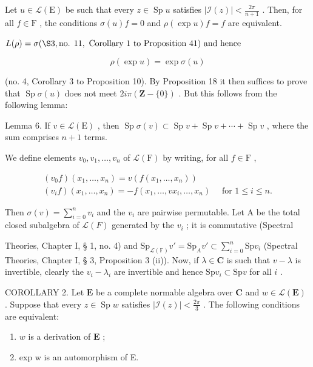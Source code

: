 Let \(u \in \mathcal{L}(\mathrm{E})\) be such that every \(z \in \operatorname{Sp} u\) satisfies \(|\mathcal{I}(z)| < \frac{2\pi}{n + 1}\) . Then, for all \(f \in \mathrm{F}\) , the conditions \(\sigma(u)f = 0\) and \(\rho(\exp u)f = f\) are equivalent.

\(L(\rho) = \sigma (\S 3, \text{no. } 11, \text{ Corollary 1 to Proposition 41}) \text{ and hence}\)

\[
\rho (\exp u) = \exp \sigma (u)
\]

(no. 4, Corollary 3 to Proposition 10). By Proposition 18 it then suffices to prove that \(\operatorname{Sp} \sigma(u)\) does not meet \(2i\pi(\mathbf{Z} - \{0\})\) . But this follows from the following lemma:

Lemma 6. If \(v \in \mathcal{L}(\mathrm{E})\) , then \(\operatorname{Sp} \sigma(v) \subset \operatorname{Sp} v + \operatorname{Sp} v + \cdots + \operatorname{Sp} v\) , where the sum comprises \(n + 1\) terms.

We define elements \(v_{0}, v_{1}, \ldots, v_{n}\) of \(\mathcal{L}(\mathrm{F})\) by writing, for all \(f \in \mathrm{F}\) ,

\[
\begin{array}{l} (v _ {0} f) (x _ {1}, \dots , x _ {n}) = v (f (x _ {1}, \dots , x _ {n})) \\ (v _ {i} f) (x _ {1}, \dots , x _ {n}) = - f (x _ {1}, \dots , v x _ {i}, \dots , x _ {n}) \quad \text { for } 1 \leqslant i \leqslant n. \end{array}
\]

Then \(\sigma(v) = \sum_{i=0}^{n} v_i\) and the \(v_i\) are pairwise permutable. Let A be the total closed subalgebra of \(\mathcal{L}(F)\) generated by the \(v_i\) ; it is commutative (Spectral

Theories, Chapter I, § 1, no. 4) and \(\mathrm{Sp}_{\mathcal{L}(\mathbb{F})}v' = \mathrm{Sp}_A v' \subset \sum_{i=0}^{n} \mathrm{Sp} v_i\) (Spectral Theories, Chapter I, § 3, Proposition 3 (ii)). Now, if \(\lambda \in \mathbf{C}\) is such that \(v - \lambda\) is invertible, clearly the \(v_i - \lambda_i\) are invertible and hence \(\mathrm{Sp} v_i \subset \mathrm{Sp} v\) for all \(i\) .

COROLLARY 2. Let \(\mathbf{E}\) be a complete normable algebra over \(\mathbf{C}\) and \(w \in \mathcal{L}(\mathbf{E})\) . Suppose that every \(z \in \operatorname{Sp} w\) satisfies \(|\mathcal{I}(z)| < \frac{2\pi}{3}\) . The following conditions are equivalent:

\begin{enumerate}
\def\labelenumi{(\roman{enumi})}
\item
  \(w\) is a derivation of \(\mathbf{E}\) ;
\item
  exp w is an automorphism of E.
\end{enumerate}

